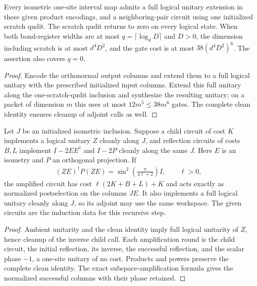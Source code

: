 \begin{lemma}
    \label{thm:mpu_clean_leaf_circuit}
    \leanok
    Every isometric one-site interval map admits a full logical
    unitary extension in these given product encodings, and a
    neighboring-pair circuit using one initialized scratch qudit.
    The scratch qudit returns to zero on every logical state.
    When both bond-register widths are at most
    $q=\lceil\log_dD\rceil$ and $D>0$, the dimension including
    scratch is at most $d^4D^2$, and the gate cost is at most
    $38(d^4D^2)^6$. The assertion also covers $q=0$.
\end{lemma}
\begin{proof}\leanok
    Encode the orthonormal output columns and extend them to a full
    logical unitary with the prescribed initialized input columns.
    Extend this full unitary along the one-scratch-qudit inclusion
    and synthesize the resulting unitary; on a packet of dimension $m$
    this uses at most $12m^5\leq38m^6$ gates. The complete clean identity
    ensures cleanup of adjoint calls as well.
\end{proof}

\begin{lemma}
    \label{thm:mpu_exact_clean_amplification_circuit}
    \leanok
    Let $J$ be an initialized isometric inclusion. Suppose a
    child circuit of cost $K$ implements a logical unitary $Z$
    cleanly along $J$, and reflection circuits of costs $B,L$
    implement $I-2EE^\dagger$ and $I-2P$ cleanly along the same $J$.
    Here $E$ is an isometry and $P$ an orthogonal projection. If
    \begin{align}
        (ZE)^\dagger P(ZE)
        =\sin^2\!\left(\frac{\pi}{4\ell+2}\right) I,
        \qquad \ell>0,
    \end{align}
    the amplified circuit has cost
    $\ell(2K+B+L)+K$ and acts exactly as normalized postselection
    on the columns $JE$. It also implements a full logical unitary
    cleanly along $J$, so its adjoint may use the same workspace.
    The given circuits are the induction data for this recursive
    step.
\end{lemma}
\begin{proof}\leanok
    Ambient unitarity and the clean identity imply full logical
    unitarity of $Z$, hence cleanup of the inverse child call.
    Each amplification round is the child circuit, the initial
    reflection, its inverse, the successful reflection, and the
    scalar phase $-1$, a one-site unitary of no cost. Products and
    powers preserve the complete
    clean identity. The exact subspace-amplification formula gives
    the normalized successful columns with their phase retained.
\end{proof}

